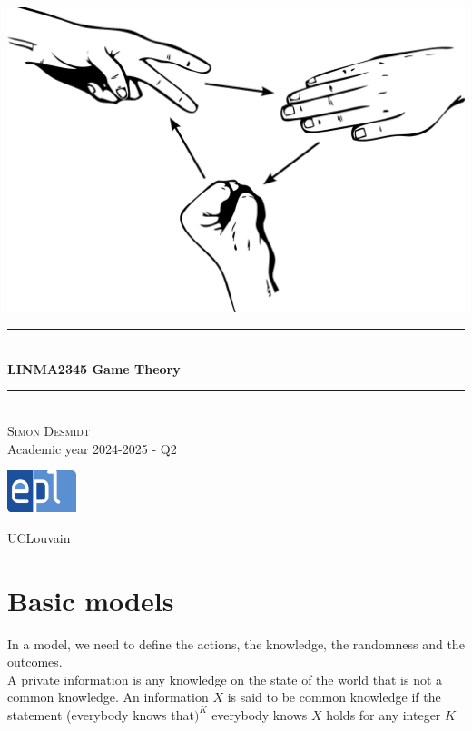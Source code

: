 \documentclass[12pt, openany]{report}
\newcommand{\HRule}{\rule{\linewidth}{0.5mm}}
\theoremstyle{definition}
\begin{document}
\begin{titlepage}
    \begin{sffamily}
    \begin{center}
        \includegraphics[scale=0.25]{img/page_de_garde.png} \\[1cm]
        \HRule \\[0.4cm]
        { \huge \bfseries LINMA2345 Game Theory \\[0.4cm] }
    
        \HRule \\[1.5cm]
        \textsc{\LARGE Simon Desmidt}\\[1cm]
        \vfill
        \vspace{2cm}
        {\large Academic year 2024-2025 - Q2}
        \vspace{0.4cm}
         
        \includegraphics[width=0.15\textwidth]{img/epl.png}
        
        UCLouvain\\
    
    \end{center}
    \end{sffamily}
\end{titlepage}

\setcounter{tocdepth}{1}
\tableofcontents
\chapter{Basic models}
In a model, we need to define the actions, the knowledge, the randomness and the outcomes. \\
A private information is any knowledge on the state of the world that is not a common knowledge. An information $X$ is said to be common knowledge if the statement (everybody knows that$)^{K}$ everybody knows $X$ holds for any integer $K$
\end{document}
